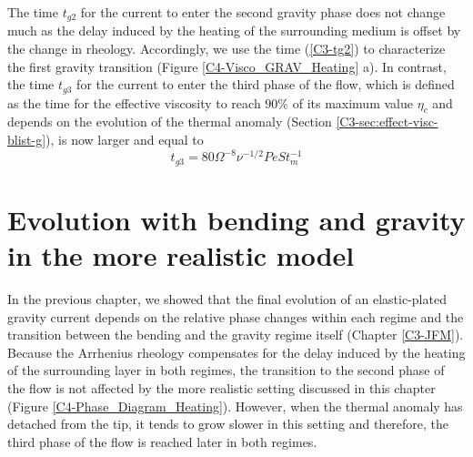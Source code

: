 The time  $t_{g2}$ for the current  to enter the second  gravity phase
does  not change  much as  the  delay induced  by the  heating of  the
surrounding medium is offset by  the change in rheology.  Accordingly,
we  use the  time  (\ref{C3-tg2}) to  characterize  the first  gravity
transition  (Figure \ref{C4-Visco_GRAV_Heating}  a). In  contrast, the
time $t_{g3}$  for the current to  enter the third phase  of the flow,
which is  defined as  the time  for the  effective viscosity  to reach
$90\%$ of its  maximum value $\eta_c$ and depends on  the evolution of
the thermal anomaly (Section \ref{C3-sec:effect-visc-blist-g}), is now
larger and equal to
\begin{equation}
  t_{g3}= 80 \Omega^{-8}\nu^{-1/2}Pe St_m^{-1}
  \label{C4-tg3}
\end{equation}

\section{Evolution  with bending  and  gravity in  the more  realistic
  model}
\label{C4-sec:evol-with-bend}

In the  previous chapter,  we showed  that the  final evolution  of an
elastic-plated gravity  current depends on the  relative phase changes
within  each regime  and the  transition between  the bending  and the
gravity regime  itself (Chapter  \ref{C3-JFM}). Because  the Arrhenius
rheology  compensates for  the delay  induced  by the  heating of  the
surrounding layer in both regimes,  the transition to the second phase
of the flow is not affected by the more realistic setting discussed in
this  chapter (Figure  \ref{C4-Phase_Diagram_Heating}). However,  when
the thermal anomaly has detached from the tip, it tends to grow slower
in this setting and therefore, the  third phase of the flow is reached
later in both regimes.

